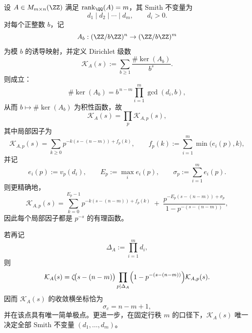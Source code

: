 \begin{theorem}\label{thm:xi-kernel-dirichlet-euler-rational-smith-completeness}
设 \(A\in M_{m\times n}(\ZZ)\) 满足 \(\operatorname{rank}_{\QQ}(A)=m\)，其 Smith 不变量为
\[
d_1\mid d_2\mid\cdots\mid d_m,\qquad d_i>0.
\]
对每个正整数 \(b\)，记
\[
A_b:(\ZZ/b\ZZ)^n\to(\ZZ/b\ZZ)^m
\]
为模 \(b\) 的诱导映射，并定义 Dirichlet 级数
\[
\mathcal K_A(s):=\sum_{b\ge 1}\frac{\#\ker(A_b)}{b^s}.
\]
则成立：
\[
\#\ker(A_b)=b^{\,n-m}\prod_{i=1}^{m}\gcd(d_i,b),
\]
从而 \(b\mapsto \#\ker(A_b)\) 为积性函数，故
\[
\mathcal K_A(s)=\prod_p \mathcal K_{A,p}(s),
\]
其中局部因子为
\[
\mathcal K_{A,p}(s)
=
\sum_{k\ge 0}p^{-k(s-(n-m))+f_p(k)},
\qquad
f_p(k):=\sum_{i=1}^{m}\min\bigl(e_i(p),k\bigr),
\]
并记
\[
e_i(p):=v_p(d_i),\qquad
E_p:=\max_i e_i(p),\qquad
\sigma_p:=\sum_{i=1}^{m}e_i(p).
\]
则更精确地，
\[
\mathcal K_{A,p}(s)
=
\sum_{k=0}^{E_p-1}p^{-k(s-(n-m))+f_p(k)}
\;+\;
\frac{p^{-E_p(s-(n-m))+\sigma_p}}{1-p^{-(s-(n-m))}},
\]
因此每个局部因子都是 \(p^{-s}\) 的有理函数。

若再记
\[
\Delta_A:=\prod_{i=1}^{m}d_i,
\]
则
\[
\mathcal K_A(s)
=
\zeta\!\bigl(s-(n-m)\bigr)
\prod_{p\mid \Delta_A}
\Bigl(1-p^{-(s-(n-m))}\Bigr)\mathcal K_{A,p}(s).
\]
因而 \(\mathcal K_A(s)\) 的收敛横坐标恰为
\[
\sigma_c=n-m+1,
\]
并在该点具有唯一简单极点。更进一步，在固定行秩 \(m\) 的口径下，\(\mathcal K_A(s)\) 唯一决定全部 Smith 不变量 \((d_1,\dots,d_m)\)。
\end{theorem}
